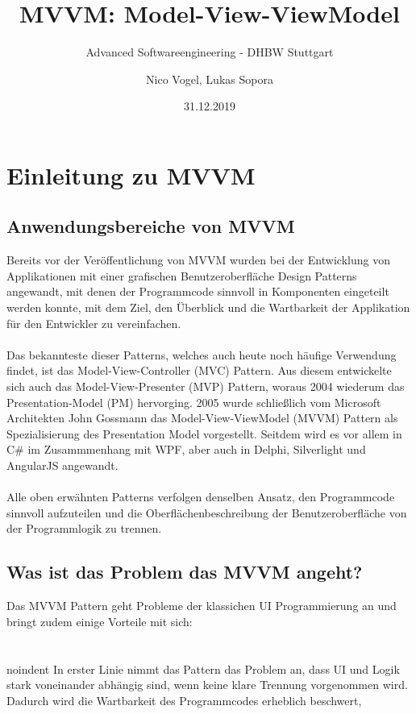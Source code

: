 \documentclass[titlepage=false,12pt]{scrreprt}
\title{MVVM: Model-View-ViewModel}
\subtitle{Advanced Softwareengineering - DHBW Stuttgart}
\author{Nico Vogel, Lukas Sopora}
\date{31.12.2019}
\begin{document}
\maketitle
	
{\renewcommand\clearpage\relax
	\tableofcontents}
\newpage

\chapter{Einleitung zu MVVM}

\section{Anwendungsbereiche von MVVM}

Bereits vor der Veröffentlichung von MVVM wurden bei der Entwicklung von Applikationen mit einer grafischen Benutzeroberfläche Design Patterns angewandt, 
mit denen der Programmcode sinnvoll in Komponenten eingeteilt werden konnte, mit dem Ziel, den Überblick und die Wartbarkeit der Applikation für den Entwickler zu vereinfachen.
\\\\
\noindent
Das bekannteste dieser Patterns, welches auch heute noch häufige Verwendung findet, ist das Model-View-Controller (MVC) Pattern.
Aus diesem entwickelte sich auch das Model-View-Presenter (MVP) Pattern, woraus 2004 wiederum das Presentation-Model (PM) hervorging.
2005 wurde schließlich vom Microsoft Architekten John Gossmann das Model-View-ViewModel (MVVM) Pattern als Spezialisierung des Presentation Model vorgestellt.
Seitdem wird es vor allem in C\# im Zusammmenhang mit WPF, aber auch in Delphi, Silverlight und AngularJS angewandt.
\\\\
\noindent
Alle oben erwähnten Patterns verfolgen denselben Ansatz, den Programmcode sinnvoll aufzuteilen und die Oberflächenbeschreibung der Benutzeroberfläche von der Programmlogik zu trennen. \par

\section{Was ist das Problem das MVVM angeht?}

Das MVVM Pattern geht Probleme der klassichen UI Programmierung an und bringt zudem einige Vorteile mit sich:
\\\\
\\noindent
In erster Linie nimmt das Pattern das Problem an, dass UI und Logik stark voneinander abhängig sind, wenn keine klare Trennung vorgenommen wird.
Dadurch wird die Wartbarkeit des Programmcodes erheblich beschwert,  
\end{document}
